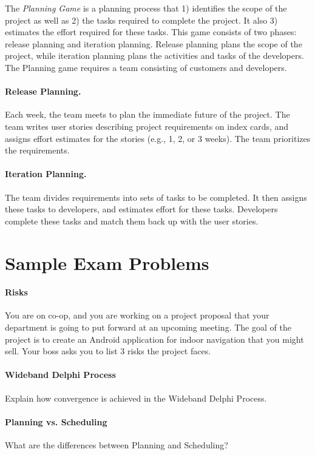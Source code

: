 The \emph{Planning Game} is a planning process that 1) identifies
the scope of the project as well as 2) the tasks required to complete
the project. It also 3) estimates the effort required for these tasks.
This game consists of two phases: release planning and iteration planning.
Release planning plans the scope of the project, while iteration
planning plans the activities and tasks of the developers. The Planning
game requires a team consisting of customers and developers.

\paragraph{Release Planning.} 
Each week, the team meets to plan the immediate future of the project.
The team writes user stories describing project requirements on index cards,
and assigns effort estimates for the stories (e.g., 1, 2, or 3 weeks).
The team prioritizes the requirements.

\paragraph{Iteration Planning.} 
The team divides requirements into sets of tasks to be completed.
It then assigns these tasks to developers, and estimates effort
for these tasks. Developers complete these tasks and match them
back up with the user stories.

\section*{Sample Exam Problems}

\paragraph{Risks}
You are on co-op, and you are working on a project proposal that your department is going to put forward at an upcoming meeting. The goal of the project is to create an Android application for indoor navigation that you might sell. Your boss asks you to list 3 risks the project faces.

\paragraph{Wideband Delphi Process}
Explain how convergence is achieved in the Wideband Delphi Process.

\paragraph{Planning vs. Scheduling }
What are the differences between Planning and Scheduling?







